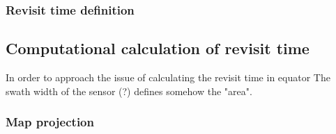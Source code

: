 


\bigskip
\subsubsection{Revisit time definition}
\bigskip


\subsection{Computational calculation of revisit time}

In order to approach the issue of calculating the revisit time in equator The swath width of the sensor (?) defines somehow the "area". 

\subsubsection{Map projection}









